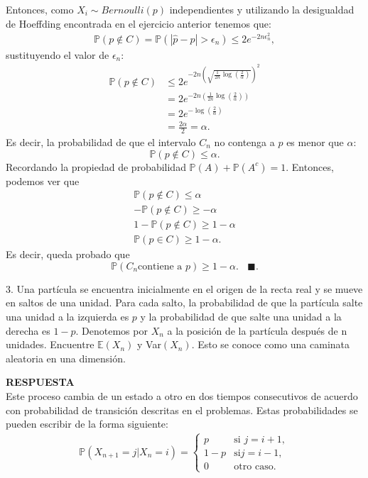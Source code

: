 \documentclass[11pt,letterpaper]{article}
\newcommand{\mP}{\mathbb{P}}
\newcommand{\mE}{\mathbb{E}}
\newcommand{\res}{\textbf{RESPUESTA}\\}
\newcommand{\finf}{\blacksquare.}
\begin{document}
Entonces, como $X_i\sim Bernoulli(p)$ independientes y utilizando la desigualdad de Hoeffding encontrada en el ejercicio anterior tenemos que:
\begin{align*}
\mP(p\not \in C)=\mP(|\hat{p}-p|>\epsilon_n)\leq 2e^{-2n\epsilon_n^2},
\end{align*}
sustituyendo el valor de $\epsilon_n$:
\begin{align*}
\mP(p\not \in C)&\leq 2e^{-2n\left(\sqrt{\frac{1}{2n} \log\left(\frac{2}{\alpha}\right)}\right)^2}\\
&= 2e^{-2n\left(\frac{1}{2n} \log\left(\frac{2}{\alpha}\right)\right)}\\
&=2e^{-\log\left(\frac{2}{\alpha}\right)}\\
&=\frac{2\alpha}{2}=\alpha.
\end{align*}
Es decir, la probabilidad de que el intervalo $C_n$ no contenga a $p$ es menor que $\alpha$:
$$\mP(p\not \in C)\leq \alpha.$$
Recordando la propiedad de probabilidad $\mP(A)+\mP(A^c)=1.$ Entonces, podemos ver que
\begin{align*}
\mP(p\not \in C)\leq \alpha\\
-\mP(p\not \in C)\geq -\alpha\\
1-\mP(p\not \in C)\geq 1-\alpha\\
\mP(p\in C)\geq 1-\alpha.
\end{align*}
Es decir, queda probado que
$$\mP(C_n \text{contiene a } p)\geq 1-\alpha. \ \ \ \ \finf$$

3. Una partícula se encuentra inicialmente en el origen de la recta real y se mueve en saltos de una unidad. Para cada salto, la probabilidad de que la partícula salte una unidad a la izquierda es $p$ y la probabilidad de que salte una unidad a la derecha es $1-p$. Denotemos por $X_n$ a la posición de la partícula después de n unidades. Encuentre $\mE(X_n)$ y Var$(X_n)$. Esto se conoce como una caminata aleatoria en una dimensión. 

\res Este proceso cambia de un estado a otro en dos tiempos consecutivos de acuerdo con probabilidad de transición descritas en el problemas. Estas probabilidades se pueden escribir de la forma siguiente:
\begin{align*}
\mP(X_{n+1}=j|X_n=i)=\left\{\begin{array}{cc}
p & \text{si } j=i+1,\\
1-p & \text{si} j=i-1,\\
0 & \text{otro caso.}
\end{array} \right.
\end{align*}
\end{document}
